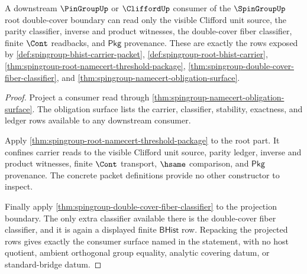 \begin{theorem}
\label{thm:spingroup-root-double-cover-consumer-exhaustion}
A downstream $\PinGroupUp$ or $\CliffordUp$ consumer of the $\SpinGroupUp$ root
double-cover boundary can read only the visible Clifford unit source, the
parity classifier, inverse and product witnesses, the double-cover fiber
classifier, finite $\Cont$ readbacks, and $\mathsf{Pkg}$ provenance. These are
exactly the rows exposed by
\autoref{def:spingroup-bhist-carrier-packet},
\autoref{def:spingroup-root-bhist-carrier},
\autoref{thm:spingroup-root-namecert-threshold-package},
\autoref{thm:spingroup-double-cover-fiber-classifier}, and
\autoref{thm:spingroup-namecert-obligation-surface}.
\end{theorem}
\begin{proof}
Project a consumer read through
\autoref{thm:spingroup-namecert-obligation-surface}. The obligation surface
lists the carrier, classifier, stability, exactness, and ledger rows available
to any downstream consumer.

Apply \autoref{thm:spingroup-root-namecert-threshold-package} to the root part.
It confines carrier reads to the visible Clifford unit source, parity ledger,
inverse and product witnesses, finite $\Cont$ transport, $\hsame$ comparison,
and $\mathsf{Pkg}$ provenance. The concrete packet definitions provide no
other constructor to inspect.

Finally apply \autoref{thm:spingroup-double-cover-fiber-classifier} to the
projection boundary. The only extra classifier available there is the
double-cover fiber classifier, and it is again a displayed finite
$\mathsf{BHist}$ row. Repacking the projected rows gives exactly the consumer
surface named in the statement, with no host quotient, ambient orthogonal group
equality, analytic covering datum, or standard-bridge datum.
\end{proof}

